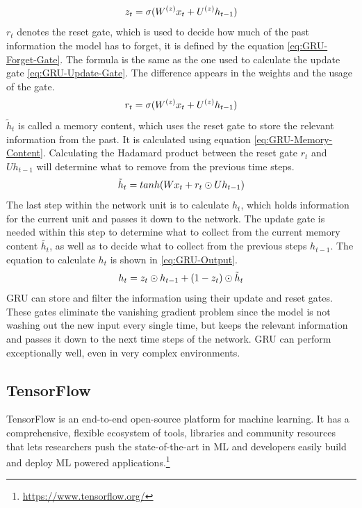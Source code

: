 \begin{equation}
    \centering
    z_t = \sigma(W^{(z)}x_t + U^{(z)}h_{t-1})
    \label{eq:GRU-Update-Gate}
\end{equation}
$r_t$ denotes the reset gate, which is used to decide how much of the past information the model has to forget, it is defined by the equation \ref{eq:GRU-Forget-Gate}. The formula is the same as the one used to calculate the update gate \ref{eq:GRU-Update-Gate}. The difference appears in the weights and the usage of the gate.
\begin{equation}
    \centering
    r_t = \sigma(W^{(z)}x_t + U^{(z)}h_{t-1})
    \label{eq:GRU-Forget-Gate}
\end{equation}
$\tilde{h}_t$ is called a memory content, which uses the reset gate to store the relevant information from the past. It is calculated using equation \ref{eq:GRU-Memory-Content}. Calculating the Hadamard product between the reset gate $r_t$ and $Uh_{t-1}$ will determine what to remove from the previous time steps.
\begin{equation}
    \centering
    \tilde{h}_t = tanh(Wx_t + r_t \odot Uh_{t-1})
    \label{eq:GRU-Memory-Content}
\end{equation}
The last step within the network unit is to calculate $h_t$, which holds information for the current unit and passes it down to the network. The update gate is needed within this step to determine what to collect from the current memory content $\tilde{h_t}$, as well as to decide what to collect from the previous steps $h_{t-1}$. The equation to calculate $h_t$ is shown in \ref{eq:GRU-Output}.
\begin{equation}
    \centering
    h_t = z_t \odot h_{t-1} + (1-z_t) \odot \tilde{h}_t
    \label{eq:GRU-Output}
\end{equation}
\gls{GRU} can store and filter the information using their update and reset gates. These gates eliminate the vanishing gradient problem since the model is not washing out the new input every single time, but keeps the relevant information and passes it down to the next time steps of the network. \gls{GRU} can perform exceptionally well, even in very complex environments.

\subsection{TensorFlow}
\label{sub:Tensorflow}
TensorFlow is an end-to-end open-source platform for machine learning. It has a comprehensive, flexible ecosystem of tools, libraries and community resources that lets researchers push the state-of-the-art in \gls{ML} and developers easily build and deploy \gls{ML} powered applications.\footnote{\url{https://www.tensorflow.org/}}

